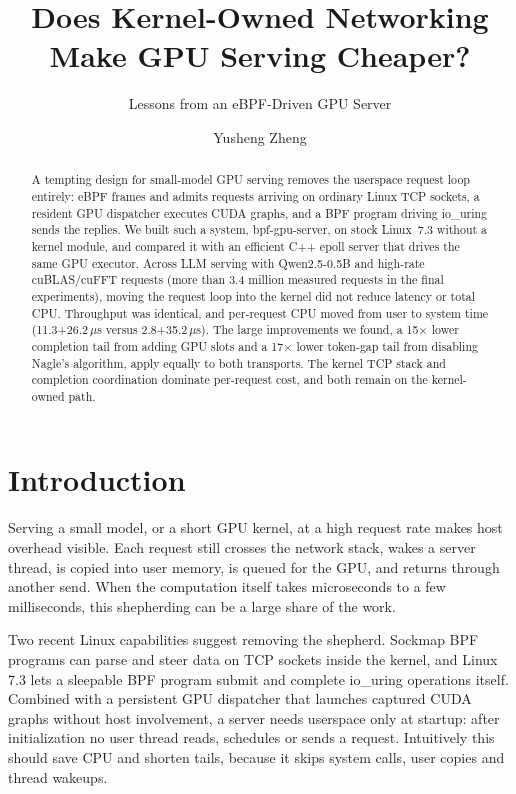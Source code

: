 \documentclass[sigconf,nonacm]{acmart}
\newcommand{\us}{\,$\mu$s}
\begin{document}
\title{Does Kernel-Owned Networking Make GPU Serving Cheaper?}
\subtitle{Lessons from an eBPF-Driven GPU Server}

\author{Yusheng Zheng}

\begin{abstract}
A tempting design for small-model GPU serving removes the userspace request
loop entirely: eBPF frames and admits requests arriving on ordinary Linux TCP
sockets, a resident GPU dispatcher executes CUDA graphs, and a BPF program
driving io\_uring sends the replies. We built such a system, bpf-gpu-server, on stock
Linux~7.3 without a kernel module, and compared it with an efficient C++ epoll
server that drives the same GPU executor. Across LLM serving with
Qwen2.5-0.5B and high-rate cuBLAS/cuFFT requests (more than 3.4 million
measured requests in the final experiments), moving the request loop into the
kernel did not reduce latency or total CPU. Throughput was identical, and
per-request CPU moved from user to system time (11.3+26.2\us{} versus
2.8+35.2\us). The large improvements we found, a 15$\times$ lower completion
tail from adding GPU slots and a 17$\times$ lower token-gap tail from disabling
Nagle's algorithm, apply equally to both transports. The kernel TCP stack and
completion coordination dominate per-request cost, and both remain on the
kernel-owned path.
\end{abstract}

\maketitle

\section{Introduction}

Serving a small model, or a short GPU kernel, at a high request rate makes host
overhead visible. Each request still crosses the network stack, wakes a server
thread, is copied into user memory, is queued for the GPU, and returns through
another send. When the computation itself takes microseconds to a few
milliseconds, this shepherding can be a large share of the work.

Two recent Linux capabilities suggest removing the shepherd. Sockmap BPF
programs can parse and steer data on TCP sockets inside the kernel, and Linux
7.3 lets a sleepable BPF program submit and complete io\_uring operations
itself. Combined with a persistent GPU dispatcher that launches captured CUDA
graphs without host involvement, a server needs userspace only at startup:
after initialization no user thread reads, schedules or sends a request.
Intuitively this should save CPU and shorten tails, because it skips system
calls, user copies and thread wakeups.
\end{document}
